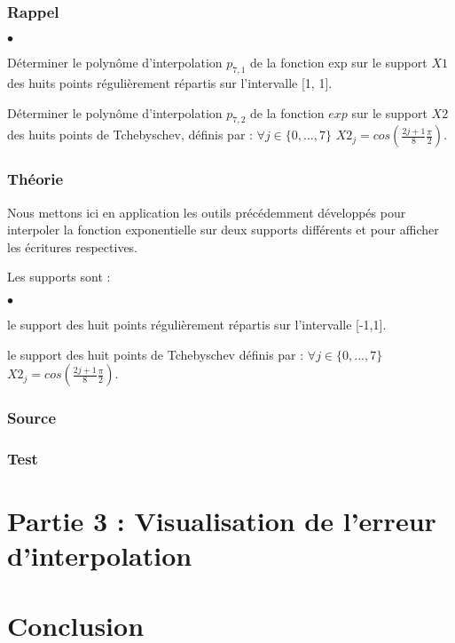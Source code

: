 \documentclass[a4paper,10pt]{report}
\begin{document}
\subsection*{Rappel}

\begin{list}{}{}
\item \begin{list}{$\bullet$}{}
\item Déterminer le polynôme d’interpolation $p_{7,1}$ de la fonction exp sur
le support $X1$ des huits points régulièrement répartis sur l’intervalle [1, 1].
\item Déterminer le polynôme d’interpolation $p_{7,2}$ de la fonction $exp$ sur le
support $X2$ des huits points de Tchebyschev, définis par : $\forall j \in \lbrace 0,...,7 \rbrace$  $X2_{j} = cos(\frac{2j+1}{8} \frac{\pi}{2}).$
\end{list}
\end{list}

\subsection*{Théorie}

Nous mettons ici en application les outils précédemment développés pour interpoler la fonction exponentielle sur deux supports différents et pour afficher les écritures respectives.

Les supports sont :
\begin{list}{}{}
\item \begin{list}{$\bullet$}{}
\item le support des huit points régulièrement répartis sur l’intervalle [-1,1].
\item le support des huit points de Tchebyschev définis par : $\forall j \in \lbrace 0,...,7 \rbrace$  $X2_{j} = cos(\frac{2j+1}{8} \frac{\pi}{2}).$

\end{list}
\end{list}

\newpage
\subsection*{Source}

\begin{center}
	
\end{center}

\subsection*{Test}

\chapter*{Partie 3 : Visualisation de l’erreur d’interpolation}

\chapter*{Conclusion}
\end{document}
